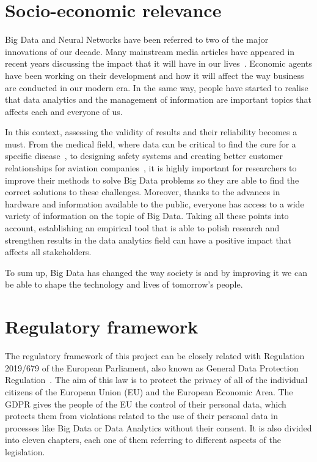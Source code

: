 \section{Socio-economic relevance}

Big Data and Neural Networks have been referred to two of the major innovations of our decade. Many mainstream media articles have appeared in recent years discussing the impact that it will have in our lives~\cite{Forbes_Article}. Economic agents have been working on their development and how it will affect the way business are conducted in our modern era. In the same way, people have started to realise that data analytics and the management of information are important topics that affects each and everyone of us.

In this context, assessing the validity of results and their reliability becomes a must. From the medical field, where data can be critical to find the cure for a specific disease~\cite{Nature_Article}, to designing safety systems and creating better customer relationships for aviation companies~\cite{Article_Aviation}, it is highly important for researchers to improve their methods to solve Big Data problems so they are able to find the correct solutions to these challenges. Moreover, thanks to the advances in hardware and information available to the public, everyone has access to a wide variety of information on the topic of Big Data. Taking all these points into account, establishing an empirical tool that is able to polish research and strengthen results in the data analytics field can have a positive impact that affects all stakeholders. %

To sum up, Big Data has changed the way society is and by improving it we can be able to shape the technology and lives of tomorrow's people.

\section{Regulatory framework}

The regulatory framework of this project can be closely related with Regulation 2019/679 of the European Parliament, also known as General Data Protection Regulation~\cite{GDPR}. The aim of this law is to protect the privacy of all of the individual citizens of the European Union (EU) and the European Economic Area. The GDPR gives the people of the EU the control of their personal data, which protects them from violations related to the use of their personal data in processes like Big Data or Data Analytics without their consent. It is also divided into eleven chapters, each one of them referring to different aspects of the legislation. 

